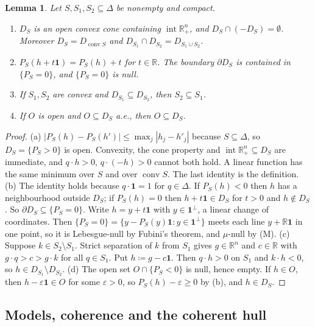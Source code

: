\documentclass[11pt]{article}
\newcommand{\R}{\mathbb{R}}
\newcommand{\one}{\mathbf{1}}
\newcommand{\Rpp}{\inter\R^n_{+}}
\DeclareMathOperator{\conv}{conv}
\DeclareMathOperator{\inter}{int}
\theoremstyle{plain}
\newtheorem{lemma}[theorem]{Lemma}
\theoremstyle{definition}
\theoremstyle{remark}
\begin{document}
\begin{lemma}\label{lem:D}
Let $S,S_1,S_2\subseteq\Delta$ be nonempty and compact.
\begin{enumerate}[label=(\alph*)]
  \item $D_S$ is an open convex cone containing $\Rpp$, and $D_S\cap(-D_S)=\emptyset$.
  Moreover $D_S=D_{\conv S}$ and $D_{S_1}\cap D_{S_2}=D_{S_1\cup S_2}$.
  \item $P_S(h+t\one)=P_S(h)+t$ for $t\in\R$. The boundary $\partial D_S$ is contained in
  $\{P_S=0\}$, and $\{P_S=0\}$ is null.
  \item If $S_1,S_2$ are convex and $D_{S_1}\subseteq D_{S_2}$, then $S_2\subseteq S_1$.
  \item If $O$ is open and $O\subseteq D_S$ a.e., then $O\subseteq D_S$.
\end{enumerate}
\end{lemma}

\begin{proof}
(a) $|P_S(h)-P_S(h')|\le\max_j|h_j-h'_j|$ because $S\subseteq\Delta$, so $D_S=\{P_S>0\}$
is open. Convexity, the cone property and $\Rpp\subseteq D_S$ are immediate, and $q\cdot
h>0$, $q\cdot(-h)>0$ cannot both hold. A linear function has the same minimum over $S$
and over $\conv S$. The last identity is the definition.
(b) The identity holds because $q\cdot\one=1$ for $q\in\Delta$. If $P_S(h)<0$ then $h$
has a neighbourhood outside $D_S$; if $P_S(h)=0$ then $h+t\one\in D_S$ for $t>0$ and
$h\notin D_S$. So $\partial D_S\subseteq\{P_S=0\}$. Write $h=y+t\one$ with $y\in
\one^\perp$, a linear change of coordinates. Then $\{P_S=0\}=\{y-P_S(y)\one:y\in
\one^\perp\}$ meets each line $y+\R\one$ in one point, so it is Lebesgue-null by Fubini's
theorem, and $\mu$-null by (M).
(c) Suppose $k\in S_2\setminus S_1$. Strict separation of $k$ from $S_1$ gives $g\in\R^n$
and $c\in\R$ with $g\cdot q>c>g\cdot k$ for all $q\in S_1$. Put $h\coloneqq g-c\one$. Then
$q\cdot h>0$ on $S_1$ and $k\cdot h<0$, so $h\in D_{S_1}\setminus D_{S_2}$.
(d) The open set $O\cap\{P_S<0\}$ is null, hence empty. If $h\in O$, then $h-\varepsilon
\one\in O$ for some $\varepsilon>0$, so $P_S(h)-\varepsilon\ge0$ by (b), and $h\in D_S$.
\end{proof}

\subsection{Models, coherence and the coherent hull}
\end{document}
